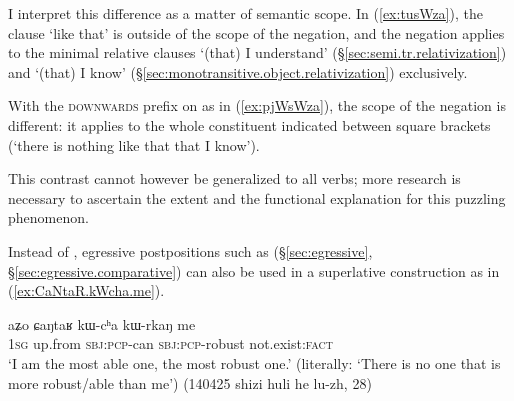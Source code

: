 I interpret this difference as a matter of semantic scope. In (\ref{ex:tusWza}),  the clause  `like that' is outside of the scope of the negation, and the negation applies to the minimal relative clauses  `(that) I understand' (§\ref{sec:semi.tr.relativization}) and  `(that) I know' (§\ref{sec:monotransitive.object.relativization}) exclusively. 

With the \textsc{downwards} prefix  on  as in (\ref{ex:pjWsWza}), the scope of the negation is different: it applies to the whole constituent indicated between square brackets (`there is nothing like that that I know').

This contrast cannot however be generalized to all verbs; more research is necessary to ascertain the extent and the functional explanation for this puzzling phenomenon.

Instead of , egressive postpositions such as  (§\ref{sec:egressive},  §\ref{sec:egressive.comparative}) can also be used in a superlative construction as in (\ref{ex:CaNtaR.kWcha.me}).

\begin{exe}
\ex \label{ex:CaNtaR.kWcha.me}
\gll  aʑo ɕaŋtaʁ kɯ-cʰa kɯ-rkaŋ me \\
\textsc{1sg} up.from \textsc{sbj}:\textsc{pcp}-can  \textsc{sbj}:\textsc{pcp}-robust not.exist:\textsc{fact} \\
\glt `I am the most able one, the most robust one.' (literally: `There is no one that is more robust/able than me') (140425 shizi huli he lu-zh, 28)
\end{exe}